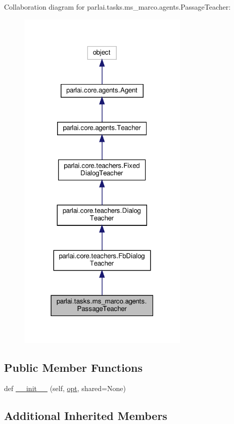 Collaboration diagram for parlai.\+tasks.\+ms\+\_\+marco.\+agents.\+Passage\+Teacher\+:\nopagebreak
\begin{figure}[H]
\begin{center}
\leavevmode
\includegraphics[width=231pt]{d7/df7/classparlai_1_1tasks_1_1ms__marco_1_1agents_1_1PassageTeacher__coll__graph}
\end{center}
\end{figure}
\subsection*{Public Member Functions}
\begin{DoxyCompactItemize}
\item 
def \hyperlink{classparlai_1_1tasks_1_1ms__marco_1_1agents_1_1PassageTeacher_a94976bd31fa3b9da0ea1c7625b22c382}{\+\_\+\+\_\+init\+\_\+\+\_\+} (self, \hyperlink{classparlai_1_1core_1_1teachers_1_1FbDialogTeacher_af7a9ec497b9cd0292d7b8fa220da7c28}{opt}, shared=None)
\end{DoxyCompactItemize}
\subsection*{Additional Inherited Members}


